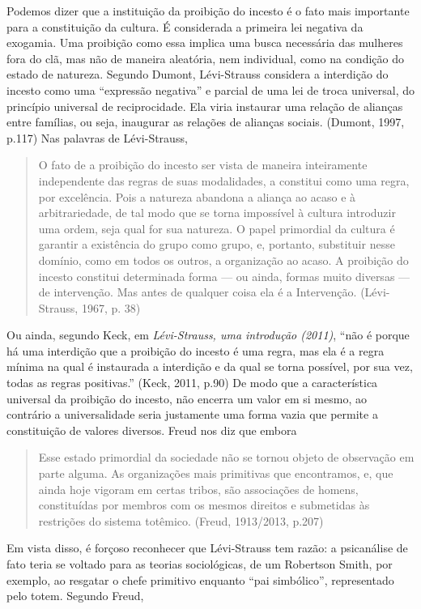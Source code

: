Podemos dizer que a instituição da proibição do incesto é o fato mais
importante para a constituição da cultura. É considerada a primeira lei
negativa da exogamia. Uma proibição como essa implica uma busca
necessária das mulheres fora do clã, mas não de maneira aleatória, nem
individual, como na condição do estado de natureza. Segundo Dumont,
Lévi-Strauss considera a interdição do incesto como uma ``expressão
negativa'' e parcial de uma lei de troca universal, do princípio
universal de reciprocidade. Ela viria instaurar uma relação de alianças
entre famílias, ou seja, inaugurar as relações de alianças sociais.
(Dumont, 1997, p.117) Nas palavras de Lévi-Strauss,

\begin{quote}
O fato de a proibição do incesto ser vista de maneira inteiramente
independente das regras de suas modalidades, a constitui como uma regra,
por excelência. Pois a natureza abandona a aliança ao acaso e à
arbitrariedade, de tal modo que se torna impossível à cultura introduzir
uma ordem, seja qual for sua natureza. O papel primordial da cultura é
garantir a existência do grupo como grupo, e, portanto, substituir nesse
domínio, como em todos os outros, a organização ao acaso. A proibição do
incesto constitui determinada forma --- ou ainda, formas muito diversas
--- de intervenção. Mas antes de qualquer coisa ela é a Intervenção.
(Lévi-Strauss, 1967, p. 38)
\end{quote}

Ou ainda, segundo Keck, em \emph{Lévi-Strauss, uma introdução (2011)},
``não é porque há uma interdição que a proibição do incesto é uma regra,
mas ela é a regra mínima na qual é instaurada a interdição e da qual se
torna possível, por sua vez, todas as regras positivas.'' (Keck, 2011,
p.90) De modo que a característica universal da proibição do incesto,
não encerra um valor em si mesmo, ao contrário a universalidade seria
justamente uma forma vazia que permite a constituição de valores
diversos. Freud nos diz que embora

\begin{quote}
Esse estado primordial da sociedade não se tornou objeto de observação
em parte alguma. As organizações mais primitivas que encontramos, e, que
ainda hoje vigoram em certas tribos, são associações de homens,
constituídas por membros com os mesmos direitos e submetidas às
restrições do sistema totêmico. (Freud, 1913/2013, p.207)
\end{quote}

Em vista disso, é forçoso reconhecer que Lévi-Strauss tem razão: a
psicanálise de fato teria se voltado para as teorias sociológicas, de um
Robertson Smith, por exemplo, ao resgatar o chefe primitivo enquanto
``pai simbólico'', representado pelo totem. Segundo Freud,

